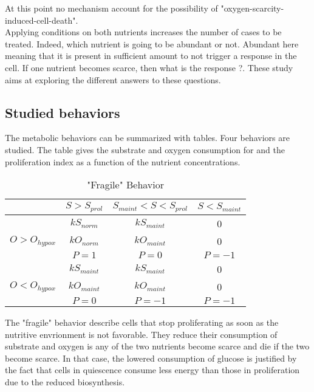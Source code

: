 \documentclass[11pt,a4paper]{article}
\begin{document}
At this point no mechanism account for the possibility of "oxygen-scarcity-induced-cell-death".\\


Applying conditions on both nutrients increases the number of cases to be treated. Indeed, which nutrient is going to be abundant or not. Abundant here meaning that it is present in sufficient amount to not trigger a response in the cell. If one nutrient becomes scarce, then what is the response ?. These study aims at exploring the different answers to these questions.\\

\subsection{Studied behaviors}
The metabolic behaviors can be summarized with tables. Four behaviors are studied. The table gives the substrate and oxygen consumption for  and the proliferation index as a function of the nutrient concentrations.\\

\begin{table}[h!]
\begin{center}
\begin{tabular}{ |c|c|c|c| }
\hline
 & \textbf{$S>S_{prol}$} & \textbf{$S_{maint}<S<S_{prol}$} & \textbf{$S<S_{maint}$} \\
\hline
 & $kS_{norm}$    &  $kS_{maint}$   & 0  \\
$O> O_{hypox}$ &  $kO_{norm}$   & $kO_{maint}$ &  0 \\
 &  $P = 1$ & $P = 0$ & $P=-1$ \\
\hline
  & $kS_{maint}$ & $kS_{maint}$ & 0 \\
$O< O_{hypox}$ & $kO_{maint}$ & $kO_{maint}$ & 0 \\
 & $P=0$  & $P=-1$ & $P=-1$ \\
\hline
\end{tabular}
\caption{"Fragile" Behavior \label{fragile}}
\end{center}
\end{table}

The "fragile" behavior describe cells that stop proliferating as soon as the nutritive envrionment is not favorable. They reduce their consumption of substrate and oxygen is  any of the two nutrients become scarce and die if the two become scarce. In that case, the lowered consumption of glucose is justified by the fact that cells in quiescence consume less energy than those in proliferation due to the reduced biosynthesis.\\
\end{document}

